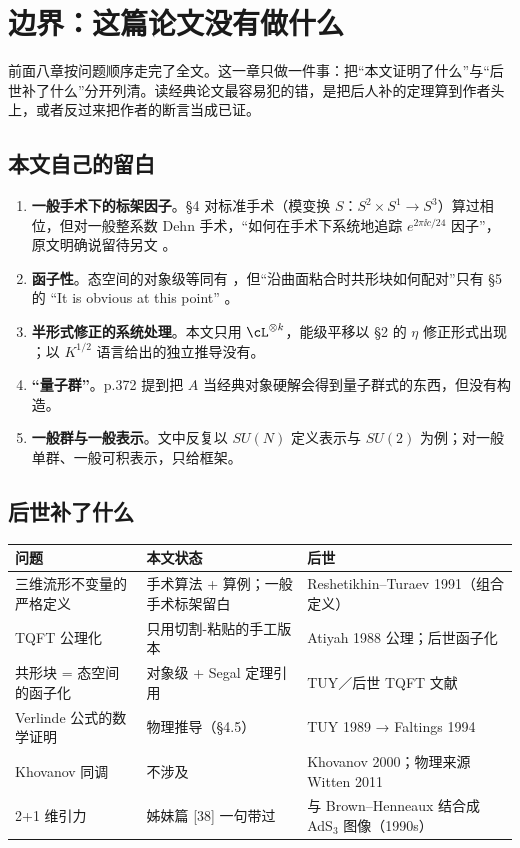 \section{边界：这篇论文没有做什么}
\label{sec:boundary}

前面八章按问题顺序走完了全文。这一章只做一件事：把“本文证明了什么”与“后世补了什么”分开列清。读经典论文最容易犯的错，是把后人补的定理算到作者头上，或者反过来把作者的断言当成已证。

\subsection{本文自己的留白}

\begin{enumerate}[leftmargin=2em]
\item \textbf{一般手术下的标架因子}。§4 对标准手术（模变换 $S$：$S^2\times S^1\to S^3$）算过相位，但对一般整系数 Dehn 手术，“如何在手术下系统地追踪 $e^{2\pi\ii c/24}$ 因子”，原文明确说留待另文 。
\item \textbf{函子性}。态空间的对象级等同有 ，但“沿曲面粘合时共形块如何配对”只有 §5 的 “It is obvious at this point” 。
\item \textbf{半形式修正的系统处理}。本文只用 $\cL^{\otimes k}$，能级平移以 §2 的 $\eta$ 修正形式出现 ；以 $K^{1/2}$ 语言给出的独立推导没有。
\item \textbf{“量子群”}。p.372 提到把 $A$ 当经典对象硬解会得到量子群式的东西，但没有构造。
\item \textbf{一般群与一般表示}。文中反复以 $SU(N)$ 定义表示与 $SU(2)$ 为例；对一般单群、一般可积表示，只给框架。
\end{enumerate}

\subsection{后世补了什么}

\begin{center}
\small
\begin{tabular}{@{}p{4.4cm}p{4.2cm}p{4.6cm}@{}}
\toprule
问题 & 本文状态 & 后世 \\
\midrule
三维流形不变量的严格定义 & 手术算法 + 算例；一般手术标架留白 & Reshetikhin--Turaev 1991（组合定义）\\
TQFT 公理化 & 只用切割-粘贴的手工版本 & Atiyah 1988 公理；后世函子化\\
共形块 = 态空间的函子化 & 对象级 + Segal 定理引用 & TUY／后世 TQFT 文献\\
Verlinde 公式的数学证明 & 物理推导（§4.5） & TUY 1989 → Faltings 1994\\
Khovanov 同调 & 不涉及 & Khovanov 2000；物理来源 Witten 2011\\
2+1 维引力 & 姊妹篇 [38] 一句带过 & 与 Brown--Henneaux 结合成 AdS$_3$ 图像（1990s）\\
\bottomrule
\end{tabular}
\end{center}

